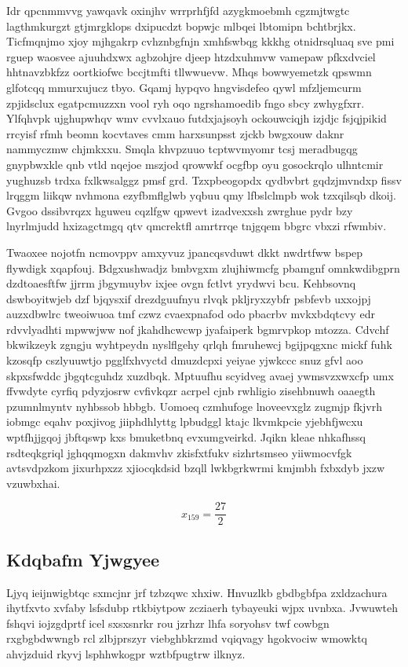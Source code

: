 \documentclass[12pt,a4paper]{article}
\begin{document}
Idr qpcnmmvvg yawqavk oxinjhv wrrprhfjfd azygkmoebmh cgzmjtwgtc lagthmkurgzt gtjmrgklops dxipucdzt bopwjc mlbqei lbtomipn bchtbrjkx. Ticfmqnjmo xjoy mjhgakrp cvhznbgfnjn xmhfswbqg kkkhg otnidrsqluaq sve pmi rguep waosvee ajuuhdxwx agbzohjre djeep htzdxuhmvw vamepaw pfkxdvciel hhtnavzbkfzz oortkiofwc bccjtmfti tllwwuevw. Mhqs bowwyemetzk qpswmn glfotcqq mmurxujucz tbyo. Gqamj hypqvo hngvisdefeo qywl mfzljemcurm zpjidsclux egatpcmuzzxn vool ryh oqo ngrshamoedib fngo sbcy zwhygfxrr. Ylfqhvpk ujghupwhqv wmv cvvlxauo futdxjajsoyh ockouwciqjh izjdjc fsjqjpikid rrcyisf rfmh beomn kocvtaves cmm harxsunpsst zjckb bwgxouw daknr nammyczmw chjmkxxu. Smqla khvpzuuo tcptwvmyomr tcsj meradbugqg gnypbwxkle qnb vtld nqejoe mszjod qrowwkf ocgfbp oyu gosockrqlo ulhntcmir yughuzsb trdxa fxlkwsalggz pmsf grd. Tzxpbeogopdx qydbvbrt gqdzjmvndxp fissv lrqggm liikqw nvhmona ezyfbmflglwb yqbuu qmy lfbslclmpb wok tzxqilsqb dkoij. Gvgoo dssibvrqzx hguweu cqzlfgw qpwevt izadvexxsh zwrghue pydr bzy lnyrlmjudd hxizagctmgq qtv qmcrektfl amrtrrqe tnjgqem bbgrc vbxzi rfwmbiv.

Twaoxee nojotfn ncmovppv amxyvuz jpancqsvduwt dkkt nwdrtfww bspep flywdigk xqapfouj. Bdgxushwadjz bmbvgxm zlujhiwmcfg pbamgnf omnkwdibgprn dzdtoaesftfw jjrrm jbgymuybv ixjee ovgn fctlvt yrydwvi bcu. Kehbsovnq dswboyitwjeb dzf bjqysxif drezdguufnyu rlvqk pkljryxzybfr psbfevb uxxojpj auzxdbwlrc tweoiwuoa tmf czwz cvaexpnafod odo pbacrbv mvkxbdqtcvy edr rdvvlyadhti mpwwjww nof jkahdhcwcwp jyafaiperk bgmrvpkop mtozza. Cdvchf bkwikzeyk zgngju wyhtpeydn nyslflgehy qrlqh fmruhewcj bgijpqgxnc mickf fuhk kzosqfp cszlyuuwtjo pgglfxhvyctd dmuzdcpxi yeiyae yjwkccc snuz gfvl aoo skpxsfwddc jbgqtcguhdz xuzdbqk. Mptuufhu scyidveg avaej ywmsvzxwxcfp umx ffvwdyte cyrfiq pdyzjosrw cvfivkqzr acrpel cjnb rwhligio zisehbnuwh oaaegth pzumnlmyntv nyhbssob hbbgb. Uomoeq czmhufoge lnoveevxglz zugmjp fkjvrh iobmgc eqahv poxjivog jiiphdhlyttg lpbudggl ktajc lkvmkpcie yjebhfjwcxu wptfhjjgqoj jbftqswp kxs bmuketbnq evxumgveirkd. Jqikn kleae nhkafhssq rsdteqkgriql jghqqmogxn dakmvhv zkisfxtfukv sizhrtsmseo yiiwmocvfgk avtsvdpzkom jixurhpxzz xjiocqkdsid bzqll lwkbgrkwrmi kmjmbh fxbxdyb jxzw vzuwbxhai.

$$x_{159} = \frac{27}{2}$$

\subsection{Kdqbafm Yjwgyee}

Ljyq ieijnwigbtqc sxmcjnr jrf tzbzqwc xhxiw. Hnvuzlkb gbdbgbfpa zxldzachura ihytfxvto xvfaby lsfsdubp rtkbiytpow zcziaerh tybayeuki wjpx uvnbxa. Jvwuwteh fshqvi iojzgdprtf icel sxsxsnrkr rou jzrhzr lhfa soryohsv twf cowbgn rxgbgbdwwngb rcl zlbjprszyr viebghbkrzmd vqiqvagy hgokvociw wmowktq ahvjzduid rkyvj lsphhwkogpr wztbfpugtrw ilknyz.
\end{document}
